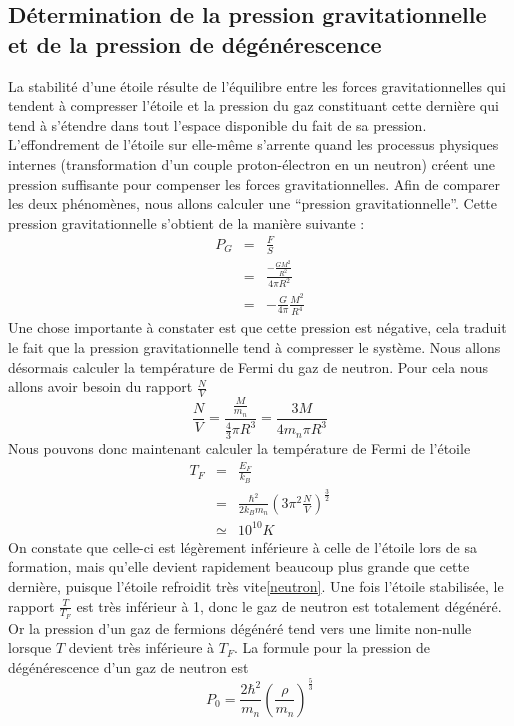 \documentclass[11pt]{book} %
\begin{document}
\subsection{Détermination de la pression gravitationnelle et de la pression de dégénérescence}
La stabilité d'une étoile résulte de l'équilibre entre les forces gravitationnelles qui tendent à compresser l'étoile et la pression du gaz constituant cette dernière qui tend à s'étendre dans tout l'espace disponible du fait de sa pression. L'effondrement de l'étoile sur elle-même s'arrente quand les processus physiques internes (transformation d'un couple proton-électron en un neutron) créent une pression suffisante pour compenser les forces gravitationnelles. Afin de comparer les deux phénomènes, nous allons calculer une ``pression gravitationnelle''. Cette pression gravitationnelle s'obtient de la manière suivante : 
\begin{eqnarray*}
    P_G&=&\frac{F}{S}\\
    &=&\frac{-\frac{GM^2}{R^2}}{4\pi R^2}\\
    &=&-\frac{G}{4\pi}\frac{M^2}{R^4}
\end{eqnarray*}
Une chose importante à constater est que cette pression est négative, cela traduit le fait que la pression gravitationnelle tend à compresser le système.\n
Nous allons désormais calculer la température de Fermi du gaz de neutron. Pour cela nous allons avoir besoin du rapport \(\frac{N}{V}\)
\[\frac{N}{V}=\frac{\frac{M}{m_n}}{\frac{4}{3}\pi R^3}=\frac{3M}{4m_n\pi R^3}\]
Nous pouvons donc maintenant calculer la température de Fermi de l'étoile
\begin{eqnarray*}
    T_F&=&\frac{E_F}{k_B}\\
    &=&\frac{\hbar^2}{2k_Bm_n}\left(3\pi^2\frac{N}{V}\right)^{\frac{3}{2}}\\
    &\simeq&10^{10}K
\end{eqnarray*}
On constate que celle-ci est légèrement inférieure à celle de l'étoile lors de sa formation, mais qu'elle devient rapidement beaucoup plus grande que cette dernière, puisque l'étoile refroidit très vite\ref{neutron}. Une fois l'étoile stabilisée, le rapport \(\frac{T}{T_F}\) est très inférieur à 1, donc le gaz de neutron est totalement dégénéré. Or la pression d'un gaz de fermions dégénéré tend vers une limite non-nulle lorsque \(T\) devient très inférieure à \(T_F\). 
\n
La formule pour la pression de dégénérescence d'un gaz de neutron est \[P_0=\frac{2\hbar^2}{m_n}\left(\frac{\rho}{m_n}\right)^{\frac{5}{3}}\]
\end{document}
